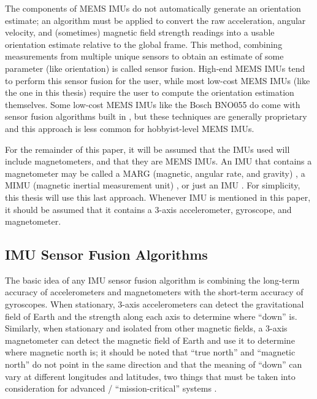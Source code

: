 \documentclass[12pt,a4paper]{report}
\begin{document}
The components of MEMS IMUs do not automatically generate an orientation estimate; an algorithm must be applied to convert the raw acceleration, angular velocity, and (sometimes) magnetic field strength readings into a usable orientation estimate relative to the global frame. This method, combining measurements from multiple unique sensors to obtain an estimate of some parameter (like orientation) is called sensor fusion. High-end MEMS IMUs tend to perform this sensor fusion for the user, while most low-cost MEMS IMUs (like the one in this thesis) require the user to compute the orientation estimation themselves. Some low-cost MEMS IMUs like the Bosch BNO055 do come with sensor fusion algorithms built in \cite{bno055}, but these techniques are generally proprietary and this approach is less common for hobbyist-level MEMS IMUs.

For the remainder of this paper, it will be assumed that the IMUs used will include magnetometers, and that they are MEMS  IMUs. An IMU that contains a magnetometer may be called a MARG (magnetic, angular rate, and gravity) \cite{madgwick}, a MIMU (magnetic inertial measurement unit) \cite{sfcomp}, or just an IMU \cite{imuadvnav}. For simplicity, this thesis will use this last approach. Whenever IMU is mentioned in this paper, it should be assumed that it contains a 3-axis accelerometer, gyroscope, and magnetometer.

\subsection{IMU Sensor Fusion Algorithms} \label{ssec:4s1s2}
The basic idea of any IMU sensor fusion algorithm is combining the long-term accuracy of accelerometers and magnetometers with the short-term accuracy of gyroscopes. When stationary, 3-axis accelerometers can detect the gravitational field of Earth and the strength along each axis to determine where “down” is. Similarly, when stationary and isolated from other magnetic fields, a 3-axis magnetometer can detect the magnetic field of Earth and use it to determine where magnetic north is; it should be noted that “true north” and “magnetic north” do not point in the same direction and that the meaning of “down” can vary at different longitudes and latitudes, two things that must be taken into consideration for advanced / “mission-critical” systems \cite{imuadvnav}. 
\end{document}
